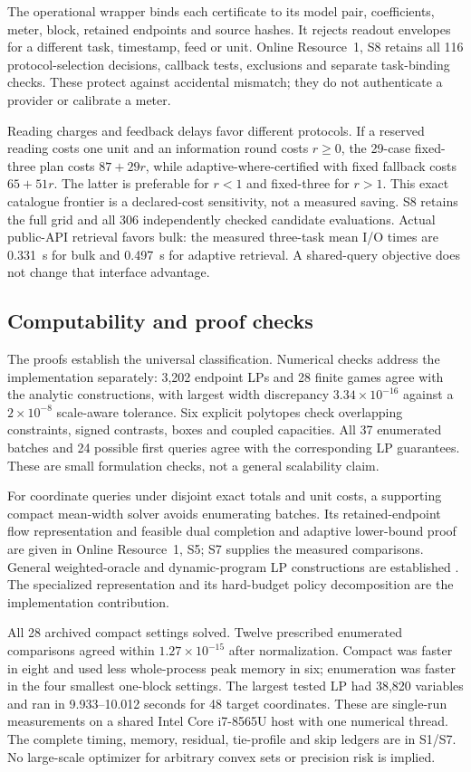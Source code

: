 The operational wrapper binds each certificate to its model pair,
coefficients, meter, block, retained endpoints and source hashes. It rejects
readout envelopes for a different task, timestamp, feed or unit. Online
Resource~1, S8 retains all 116 protocol-selection decisions, callback tests,
exclusions and separate task-binding checks. These protect against accidental
mismatch; they do not authenticate a provider or calibrate a meter.

Reading charges and feedback delays favor different protocols. If a reserved
reading costs one unit and an information round costs $r\geq0$, the 29-case
fixed-three plan costs $87+29r$, while adaptive-where-certified with fixed
fallback costs $65+51r$. The latter is preferable for $r<1$ and fixed-three
for $r>1$. This exact catalogue frontier is a declared-cost sensitivity,
not a measured saving. S8 retains the full grid and all 306 independently
checked candidate evaluations. Actual public-API retrieval favors bulk:
the measured three-task mean I/O times are 0.331~s for bulk and 0.497~s for
adaptive retrieval. A shared-query objective does not change that interface
advantage.
\subsection{Computability and proof checks}
The proofs establish the universal classification. Numerical checks address
the implementation separately: 3,202 endpoint LPs and 28 finite games agree
with the analytic constructions, with largest width discrepancy
$3.34\times10^{-16}$ against a $2\times10^{-8}$ scale-aware tolerance.
Six explicit polytopes check overlapping constraints, signed contrasts,
boxes and coupled capacities. All 37 enumerated batches and 24 possible
first queries agree with the corresponding LP guarantees. These are small
formulation checks, not a general scalability claim.

For coordinate queries under disjoint exact totals and unit costs, a
supporting compact mean-width solver avoids enumerating batches.
Its retained-endpoint flow representation and feasible dual completion
and adaptive lower-bound proof are given in Online Resource~1, S5;
S7 supplies the measured comparisons. General weighted-oracle
and dynamic-program LP constructions are established
\citep{kawase2024,martin1990}. The specialized representation and its
hard-budget policy decomposition are the implementation contribution.

All 28 archived compact settings solved. Twelve prescribed enumerated
comparisons agreed within $1.27\times10^{-15}$ after normalization.
Compact was faster in eight and used less whole-process peak memory in
six; enumeration was faster in the four smallest one-block settings.
The largest tested LP had 38,820 variables and ran in 9.933--10.012 seconds
for 48 target coordinates. These are single-run measurements on a shared
Intel Core i7-8565U host with one numerical thread. The complete timing,
memory, residual, tie-profile and skip ledgers are in S1/S7.
No large-scale optimizer for arbitrary convex sets or precision risk is implied.
